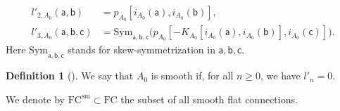 \documentclass[11pt,a4paper]{amsart}
\theoremstyle{plain} %
\theoremstyle{definition}
\newtheorem{defn}[thm]{Definition}
\theoremstyle{remark}
\newtheorem{ass}[thm]{Assumption}
\newcommand{\g}{\mathfrak{g}}
\newcommand{\mr}{\mathrm}
\newcommand{\sfa}{\mathsf{a}}
\newcommand{\sfb}{\mathsf{b}}
\newcommand{\sfc}{\mathsf{c}}
\newcommand{\M}{\mathcal{M}}
\newcommand{\FC}{\mathrm{FC}}
\begin{document}
\begin{align*}
l'_{2,A_0}(\sfa,\sfb) &= p_{A_0}[i_{A_0}(\sfa),i_{A_0}(\sfb)], \\
l'_{3,A_0}(\sfa,\sfb,\sfc) &= {\mr{Sym}_{\sfa,\sfb,\sfc}}\Big( p_{A_0}[-K_{A_0}[i_{A_0}(\sfa),i_{A_0}(\sfb)],i_{A_0}(\sfc)] \Big).
\end{align*}
{ Here $\mr{Sym}_{\sfa,\sfb,\sfc}$ stands for skew-symmetrization in $\sfa,\sfb,\sfc$.}
\begin{defn}[\cite{Cattaneo2014}]\label{def: smooth}
We say that $A_0$ is smooth if, for all $n \geq 0$, we have $l'_n = 0$.
\end{defn}
We denote by $\FC^\mr{sm} \subset \FC$ the subset of all smooth flat connections. 

\end{document}
